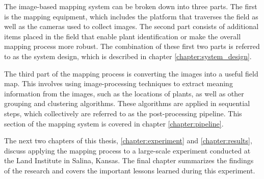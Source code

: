 The image-based mapping system can be broken down into three parts.  The first is the mapping equipment, which includes the platform that traverses the field as well as the cameras used to collect images.  The second part consists of additional items placed in the field that enable plant identification or make the overall mapping process more robust.  The combination of these first two parts is referred to as the system design, which is described in chapter \ref{chapter:system_design}. 

The third part of the mapping process is converting the images into a useful field map.  This involves using image-processing techniques to extract meaning information from the images, such as the locations of plants, as well as other grouping and clustering algorithms.  These algorithms are applied in sequential steps, which collectively are referred to as the post-processing pipeline.  This section of the mapping system is covered in chapter \ref{chapter:pipeline}. 

The next two chapters of this thesis, \ref{chapter:experiment} and \ref{chapter:results}, discuss applying the mapping process to a large-scale experiment conducted at the Land Institute in Salina, Kansas.  The final chapter summarizes the findings of the research and covers the important lessons learned during this experiment.
